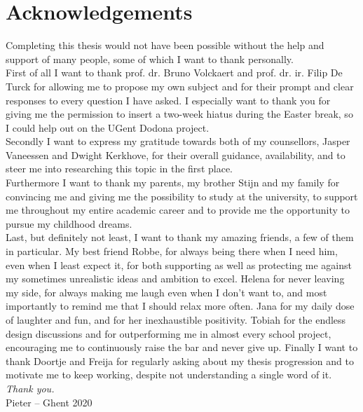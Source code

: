 
\chapter*{Acknowledgements}

Completing this thesis would not have been possible without the help and support of many people, some of which I want to thank personally.\\

\noindent First of all I want to thank prof. dr. Bruno Volckaert and prof. dr. ir. Filip De Turck for allowing me to propose my own subject and for their prompt and clear responses to every question I have asked. I especially want to thank you for giving me the permission to insert a two-week hiatus during the Easter break, so I could help out on the UGent Dodona project.\\

\noindent Secondly I want to express my gratitude towards both of my counsellors, Jasper Vaneessen and Dwight Kerkhove, for their overall guidance, availability, and to steer me into researching this topic in the first place.\\

\noindent Furthermore I want to thank my parents, my brother Stijn and my family for convincing me and giving me the possibility to study at the university, to support me throughout my entire academic career and to provide me the opportunity to pursue my childhood dreams.\\

\noindent Last, but definitely not least, I want to thank my amazing friends, a few of them in particular. My best friend Robbe, for always being there when I need him, even when I least expect it, for both supporting as well as protecting me against my sometimes unrealistic ideas and ambition to excel. Helena for never leaving my side, for always making me laugh even when I don't want to, and most importantly to remind me that I should relax more often. Jana for my daily dose of laughter and fun, and for her inexhaustible positivity. Tobiah for the endless design discussions and for outperforming me in almost every school project, encouraging me to continuously raise the bar and never give up. Finally I want to thank Doortje and Freija for regularly asking about my thesis progression and to motivate me to keep working, despite not understanding a single word of it.\\

\noindent \emph{Thank you.}\\

\noindent Pieter -- Ghent 2020